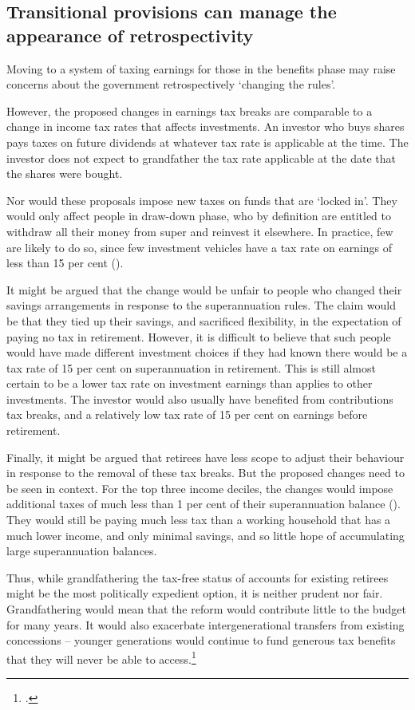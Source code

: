 \subsection{Transitional provisions can manage the appearance of retrospectivity}\label{sec:SUPER-6-5}
Moving to a system of taxing earnings for those in the benefits phase may raise concerns about the government retrospectively ‘changing the rules’. 

However, the proposed changes in earnings tax breaks are comparable to a change in income tax rates that affects investments. An investor who buys shares pays taxes on future dividends at whatever tax rate is applicable at the time. The investor does not expect to grandfather the tax rate applicable at the date that the shares were bought. 

Nor would these proposals impose new taxes on funds that are ‘locked in’. They would only affect people in draw-down phase, who by definition are entitled to withdraw all their money from super and reinvest it elsewhere. In practice, few are likely to do so, since few investment vehicles have a tax rate on earnings of less than 15 per cent ().

It might be argued that the change would be unfair to people who changed their savings arrangements in response to the superannuation rules. The claim would be that they tied up their savings, and sacrificed flexibility, in the expectation of paying no tax in retirement. However, it is difficult to believe that such people would have made different investment choices if they had known there would be a tax rate of 15 per cent on superannuation in retirement. This is still almost certain to be a lower tax rate on investment earnings than applies to other investments. The investor would also usually have benefited from contributions tax breaks, and a relatively low tax rate of 15 per cent on earnings before retirement.

Finally, it might be argued that retirees have less scope to adjust their behaviour in response to the removal of these tax breaks. But the proposed changes need to be seen in context. For the top three income deciles, the changes would impose additional taxes of much less than 1 per cent of their superannuation balance (). They would still be paying much less tax than a working household that has a much lower income, and only minimal savings, and so little hope of accumulating large superannuation balances. 

Thus, while grandfathering the tax-free status of accounts for existing retirees might be the most politically expedient option, it is neither prudent nor fair. Grandfathering would mean that the reform would contribute little to the budget for many years. It would also exacerbate intergenerational transfers from existing concessions – younger generations would continue to fund generous tax benefits that they will never be able to access.\footcite[][47]{DaleyWoodWeidmannEtAl2014}  

